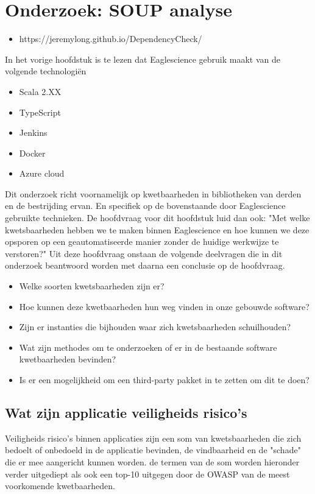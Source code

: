 
\chapter{Onderzoek: SOUP analyse} %

\begin{itemize}
\item https://jeremylong.github.io/DependencyCheck/
\end{itemize}

\label{OndSOUPAnalyse} %
In het vorige hoofdstuk is te lezen dat Eaglescience gebruik maakt van de volgende technologi\"en
\begin{itemize}
  \item Scala 2.XX
  \item TypeScript
  \item Jenkins
  \item Docker
  \item Azure cloud
\end{itemize}
Dit onderzoek richt voornamelijk op kwetbaarheden in bibliotheken  van derden en de bestrijding ervan. En specifiek op de bovenstaande door Eaglescience gebruikte technieken. De hoofdvraag voor dit hoofdstuk luid dan ook: "Met welke kwetsbaarheden hebben we te maken binnen Eaglescience en hoe kunnen we deze opsporen op een geautomatiseerde manier zonder de huidige werkwijze te verstoren?" Uit deze hoofdvraag onstaan de volgende deelvragen die in dit onderzoek beantwoord worden met daarna een conclusie op de hoofdvraag.

\begin{itemize}
\item Welke soorten kwetsbaarheden zijn er?
\item Hoe kunnen deze kwetbaarheden hun weg vinden in onze gebouwde software?
\item Zijn er instanties die bijhouden waar zich kwetsbaarheden schuilhouden?
\item Wat zijn methodes om te onderzoeken of er in de bestaande software kwetbaarheden bevinden?
\item Is er een mogelijkheid om een third-party pakket in te zetten om dit te doen?
\end{itemize}

\section{Wat zijn applicatie veiligheids risico's}
Veiligheids risico's binnen applicaties zijn een som van kwetsbaarheden die zich bedoelt of onbedoeld in de applicatie bevinden, de vindbaarheid en de "schade" die er mee aangericht kunnen worden. de termen van de som worden hieronder verder uitgediept als ook een top-10 uitgegen door de OWASP van de meest voorkomende kwetbaarheden.

